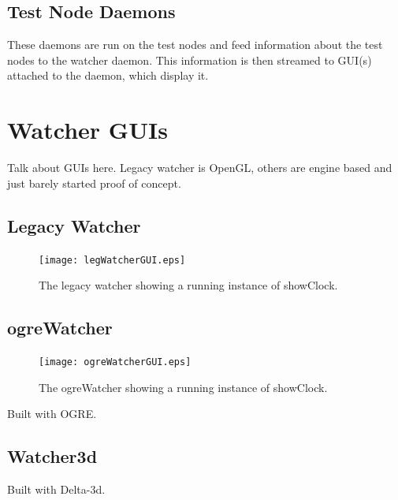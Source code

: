 \documentclass{article}
\begin{document}
\subsection{Test Node Daemons}
These daemons are run on the test nodes and feed information about the test nodes to the watcher daemon. This information is then streamed to GUI(s) attached to the daemon, which display it.





\section{Watcher GUIs}

Talk about GUIs here. Legacy watcher is OpenGL, others are engine based and just barely started proof of concept.

\subsection{Legacy Watcher}
\label{LegacyWatcher}
\begin{figure}[here]
\label{fig:LegacyWatcherClock}
\centering
\texttt{[image: legWatcherGUI.eps]}
\caption{The legacy watcher showing a running instance of showClock.}
\end{figure}

\subsection{ogreWatcher}
\begin{figure}
\centering
\texttt{[image: ogreWatcherGUI.eps]}
\caption{The ogreWatcher showing a running instance of showClock.}
\end{figure}

Built with OGRE.
\subsection{Watcher3d}
Built with Delta-3d.

\printindex
\end{document}
